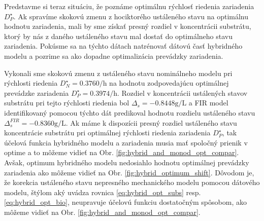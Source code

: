 Predstavme si teraz situáciu, že poznáme optimálnu rýchlosť riedenia zariadenia $ D_{P}^{\star} $. Ak spravíme skokovú zmenu z hociktorého ustáleného stavu na optimálnu hodnotu zariadenia, mali by sme získať presný rozdiel v koncentrácii substrátu, ktorý by nás z daného ustáleného stavu mal dostať do optimálneho stavu zariadenia. Pokúsme sa na týchto dátach natrénovať dátovú časť hybridného modelu a pozrime sa ako dopadne optimalizácia prevádzky zariadenia. 

Vykonali sme skokovú zmenu z ustáleného stavu nominálneho modelu pri rýchlosti riedenia $ D_{N}^{\star} = 0.3760\si{\per\hour} $ na hodnotu zodpovedajúcu optimálnej prevádzke zariadenia $ D_{P}^{\star} = 0.3974\si{\per\hour} $. Rozdiel v koncentrácii ustálených stavov substrátu pri tejto rýchlosti riedenia bol $ \Delta_{s} = -0.8448\si{\gram\per\liter} $ a FIR model identifikovaný pomocou týchto dát predikoval hodnotu rozdielu ustáleného stavu $ \Delta_{s}^{FIR} = -0.8360\si{\gram\per\liter} $. Ak máme k dispozícii presný rozdiel ustáleného stavu koncentrácie substrátu pri optimálnej rýchlosti riedenia zariadenia $ D_{P}^{\star} $, tak účelová funkcia hybridného modelu a zariadenia musia mať spoločný prienik v optime a to môžeme vidieť na Obr. \ref{fig:hybrid_and_monod_opt_compar}. Avšak, optimum hybridného modelu nedosiahlo hodnotu optimálnej prevádzky zariadenia ako môžeme vidieť na Obr. \ref{fig:hybrid_optimum_shift}. Dôvodom je, že korekcia ustáleného stavu nepresného mechanického modelu pomocou dátového modelu, štýlom aký uvádza rovnica \eqref{eq:hybrid_opt_subs} resp. \eqref{eq:hybrid_opt_bio}, neupravuje účelovú funkciu dostatočným spôsobom, ako môžeme vidieť na Obr. \ref{fig:hybrid_and_monod_opt_compar}. 
